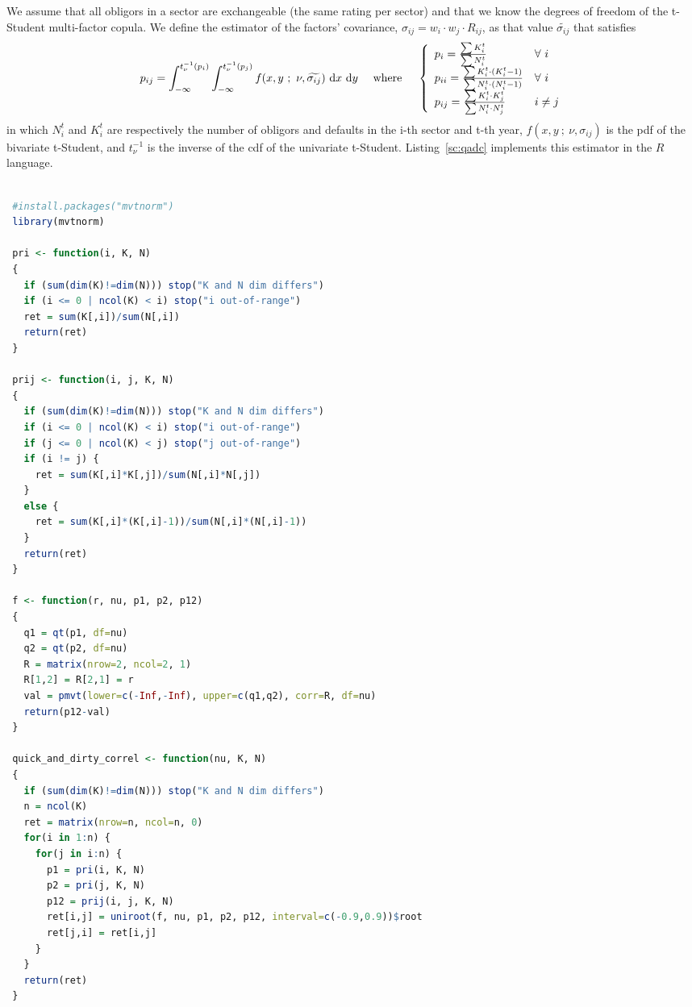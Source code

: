 \documentclass[11pt,fleqn]{book} %
\begin{document}
\begin{definition}
	We assume that all obligors in a sector are exchangeable (the same rating 
	per sector) and that we know the degrees of freedom of the t-Student 
	multi-factor copula. We define the estimator of the factors' covariance, 
	$\sigma_{ij} = w_i \cdot w_j \cdot R_{ij}$, as that value 
	$\widetilde{\sigma_{ij}}$ that satisfies
	\begin{displaymath}
		p_{ij} = \displaystyle \int_{-\infty}^{t_{\nu}^{-1}(p_i)} \int_{-\infty}^{t_{\nu}^{-1}(p_j)} 
		f(x,y\ ;\ \nu, \widetilde{\sigma_{ij}}) \mathop{\,\mathrm{{}d}}\mathopen{} x \mathop{\,\mathrm{{}d}}\mathopen{} y
		\quad \text{ where } \quad
		\left\{
			\begin{array}{ll}
				p_i = \frac{\sum K_i^t}{\sum N_i^t} & \forall\ i \\
				p_{ii} = \frac{\sum K_i^t \cdot (K_i^t-1)}{\sum N_i^t \cdot (N_i^t-1)} & \forall\ i \\
				p_{ij} = \frac{\sum K_i^t \cdot K_j^t}{\sum N_i^t \cdot N_j^t} & i \ne j \\
			\end{array}
		\right.
	\end{displaymath}
	in which $N_i^t$ and $K_i^t$ are respectively the number of obligors and 
	defaults in the i-th sector and t-th year, $f(x,y\ ;\ \nu,\sigma_{ij})$ 
	is the pdf of the bivariate t-Student, and $t_{\nu}^{-1}$ is the inverse 
	of the cdf of the univariate t-Student. Listing~\ref{sc:qadc} implements 
	this estimator in the $R$ language.
\end{definition}

\begin{lstlisting}[language=R, label=sc:qadc, caption=Quick-and-dirty correlation (R script)]

 #install.packages("mvtnorm")
 library(mvtnorm)

 pri <- function(i, K, N)
 {
   if (sum(dim(K)!=dim(N))) stop("K and N dim differs")
   if (i <= 0 | ncol(K) < i) stop("i out-of-range")
   ret = sum(K[,i])/sum(N[,i])
   return(ret)
 }

 prij <- function(i, j, K, N)
 {
   if (sum(dim(K)!=dim(N))) stop("K and N dim differs")
   if (i <= 0 | ncol(K) < i) stop("i out-of-range")
   if (j <= 0 | ncol(K) < j) stop("j out-of-range")
   if (i != j) {
     ret = sum(K[,i]*K[,j])/sum(N[,i]*N[,j])
   }
   else {
     ret = sum(K[,i]*(K[,i]-1))/sum(N[,i]*(N[,i]-1))
   }
   return(ret)
 }

 f <- function(r, nu, p1, p2, p12)
 {
   q1 = qt(p1, df=nu)
   q2 = qt(p2, df=nu)
   R = matrix(nrow=2, ncol=2, 1)
   R[1,2] = R[2,1] = r
   val = pmvt(lower=c(-Inf,-Inf), upper=c(q1,q2), corr=R, df=nu)
   return(p12-val)
 }

 quick_and_dirty_correl <- function(nu, K, N)
 {
   if (sum(dim(K)!=dim(N))) stop("K and N dim differs")
   n = ncol(K)
   ret = matrix(nrow=n, ncol=n, 0)
   for(i in 1:n) {
     for(j in i:n) {
       p1 = pri(i, K, N)
       p2 = pri(j, K, N)
       p12 = prij(i, j, K, N)
       ret[i,j] = uniroot(f, nu, p1, p2, p12, interval=c(-0.9,0.9))$root
       ret[j,i] = ret[i,j]
     }
   }
   return(ret)
 }

\end{lstlisting}
\end{document}
